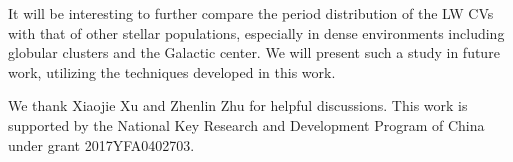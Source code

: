 \documentclass[fleqn,usenatbib]{mnras}
\begin{document}
It will be interesting to further compare the period distribution of the LW CVs with that of other stellar populations, especially in dense environments including globular clusters and the Galactic center. We will present such a study in future work, utilizing the techniques developed in this work.

\vskip0.5cm
We thank Xiaojie Xu and Zhenlin Zhu for helpful discussions. This work is supported by the National Key Research and Development Program of China under grant 2017YFA0402703.


{}

\appendix
\end{document}
